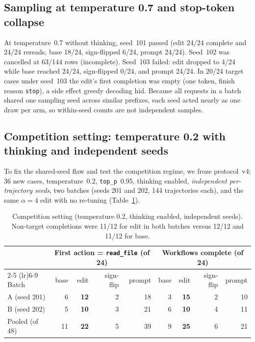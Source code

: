 \documentclass[11pt]{article}
\begin{document}
\subsection{Sampling at temperature 0.7 and stop-token collapse}
At temperature~0.7 without thinking, seed~101 passed (edit 24/24 complete and 24/24 rereads, base 18/24, sign-flipped 6/24, prompt 24/24). Seed~102 was cancelled at 63/144 rows (incomplete). Seed~103 failed: edit dropped to 4/24 while base reached 24/24, sign-flipped 0/24, and prompt 24/24. In 20/24 target cases under seed~103 the edit's first completion was empty (one token, finish reason \texttt{stop}), a side effect greedy decoding hid. Because all requests in a batch shared one sampling seed across similar prefixes, each seed acted nearly as one draw per arm, so within-seed counts are not independent samples.

\subsection{Competition setting: temperature 0.2 with thinking and independent seeds}
To fix the shared-seed flaw and test the competition regime, we froze protocol~v4: 36 new cases, temperature~0.2, \texttt{top\_p}~0.95, thinking enabled, \emph{independent per-trajectory seeds}, two batches (seeds 201 and 202, 144 trajectories each), and the same $\alpha=4$ edit with no re-tuning (Table~\ref{tab:v4}).

\begin{table}[ht]
\centering
\caption{Competition setting (temperature 0.2, thinking enabled, independent seeds). Non-target completions were 11/12 for edit in both batches versus 12/12 and 11/12 for base.}
\label{tab:v4}
\vspace{2pt}
\begin{tabular}{lrrrrrrrr}
\toprule
 & \multicolumn{4}{c}{First action = \texttt{read\_file} (of 24)} & \multicolumn{4}{c}{Workflows complete (of 24)} \\
\cmidrule(lr){2-5} \cmidrule(lr){6-9}
Batch & base & edit & sign-flip & prompt & base & edit & sign-flip & prompt \\ \midrule
A (seed 201) & 6 & \textbf{12} & 2 & 18 & 3 & \textbf{15} & 2 & 10 \\
B (seed 202) & 5 & \textbf{10} & 3 & 21 & 6 & \textbf{10} & 4 & 11 \\ \midrule
Pooled (of 48) & 11 & \textbf{22} & 5 & 39 & 9 & \textbf{25} & 6 & 21 \\ \bottomrule
\end{tabular}
\end{table}
\end{document}
